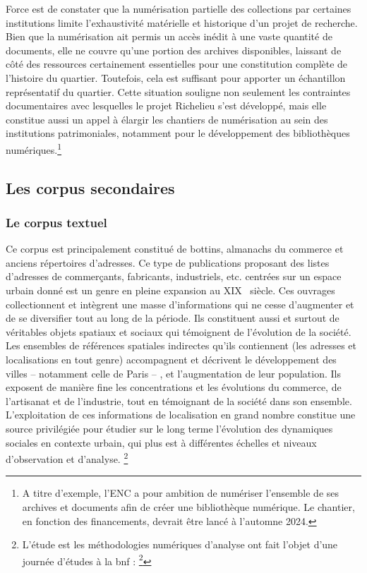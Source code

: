 \newpage

Force est de constater que la numérisation partielle des collections par certaines institutions limite l'exhaustivité matérielle et historique d'un projet de recherche. Bien que la numérisation ait permis un accès inédit à une vaste quantité de documents, elle ne couvre qu'une portion des archives disponibles, laissant de côté des ressources certainement essentielles pour une constitution complète de l'histoire du quartier. Toutefois, cela est suffisant pour apporter un échantillon représentatif du quartier. Cette situation souligne non seulement les contraintes documentaires avec lesquelles le projet Richelieu s'est développé, mais elle constitue aussi un appel à élargir les chantiers de numérisation au sein des institutions patrimoniales, notamment pour le développement des bibliothèques numériques.\footnote{A titre d'exemple, l'ENC a pour ambition de numériser l'ensemble de ses archives et documents afin de créer une bibliothèque numérique. Le chantier, en fonction des financements, devrait être lancé à l'automne 2024.} 

\subsection{Les corpus secondaires}
\subsubsection{Le corpus textuel}
Ce corpus est principalement constitué de bottins, almanachs du commerce et anciens répertoires d'adresses. Ce type de publications proposant des listes d'adresses de commerçants, fabricants, industriels, etc. centrées sur un espace urbain donné est un genre en pleine expansion au XIX\ieme~  siècle. Ces ouvrages collectionnent et intègrent une masse d'informations qui ne cesse d'augmenter et de se diversifier tout au long de la période. Ils constituent aussi et surtout de véritables objets spatiaux et sociaux qui témoignent de l'évolution de la société. Les ensembles de références spatiales indirectes qu'ils contiennent (les adresses et localisations en tout genre) accompagnent et décrivent le développement des villes – notamment celle de Paris – , et l'augmentation de leur population. Ils exposent de manière fine les concentrations et les évolutions du commerce, de l'artisanat et de l'industrie, tout en témoignant de la société dans son ensemble. L'exploitation de ces informations de localisation en grand nombre constitue une source privilégiée pour étudier sur le long terme l'évolution des dynamiques sociales en contexte urbain, qui plus est à différentes échelles et niveaux d'observation et d'analyse. \footnote{L'étude est les méthodologies numériques d'analyse ont fait l'objet d'une journée d'études à la \acrshort{bnf} : \footcite{BNFJournee2022}}

